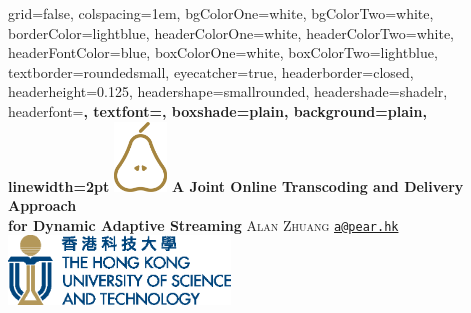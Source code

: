 \documentclass[landscape,final,a0paper,fontscale=0.285]{baposter}
\begin{document}
\begin{poster}%
  {
  grid=false,
  colspacing=1em,
  bgColorOne=white,
  bgColorTwo=white,
  borderColor=lightblue,
  headerColorOne=white,%
  headerColorTwo=white,%
  headerFontColor=blue,%
  boxColorOne=white,
  boxColorTwo=lightblue,
  textborder=roundedsmall,%
  eyecatcher=true,
  headerborder=closed,
  headerheight=0.125\textheight,
  headershape=smallrounded,
  headershade=shadelr,
  headerfont=\Large\bf\textsc, %
  textfont={\setlength{\parindent}{1.5em}},
  boxshade=plain,
  background=plain,
  linewidth=2pt
  }
  {\includegraphics[height=5em]{logo/PearLogo.eps}} 
  {\bf{A Joint Online Transcoding and Delivery Approach\\ for Dynamic Adaptive Streaming}\vspace{0.25em}}
  {\textsc{ Alan Zhuang      }  \href{mailto:a@pear.hk}{\nolinkurl{a@pear.hk}}}
  {%
    \includegraphics[height=5em]{logo/UST_L4.eps}
  }

    \newcommand{\colouredcircle}{%
      \tikz{\useasboundingbox (-0.2em,-0.32em) rectangle(0.2em,0.32em); \draw[draw=black,fill=lightblue,line width=0.03em] (0,0) circle(0.18em);}}


\end{poster}
\end{document}
